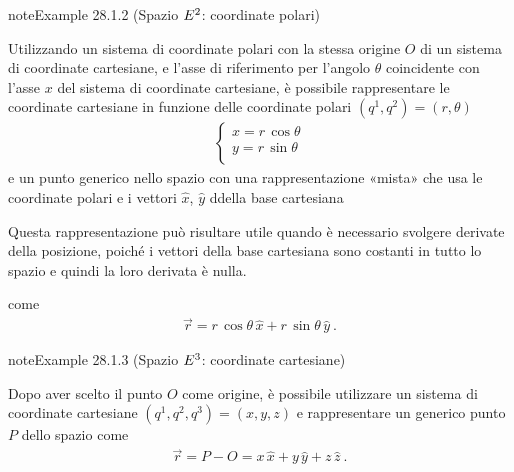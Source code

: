 \documentclass[letterpaper,10pt,italian]{jupyterBook}
\begin{document}
\begin{sphinxadmonition}{note}{Example 28.1.2 (Spazio \protect\(E^2\protect\): coordinate polari)}



\sphinxAtStartPar
Utilizzando un sistema di coordinate polari con la stessa origine \(O\) di un sistema di coordinate cartesiane, e l’asse di riferimento per l’angolo \(\theta\) coincidente con l’asse \(x\) del sistema di coordinate cartesiane, è possibile rappresentare le coordinate cartesiane in funzione delle coordinate polari \((q^1, q^2) = (r, \theta)\)
\begin{equation*}
\begin{split}\begin{cases}
  x = r \, \cos \theta \\
  y = r \, \sin \theta \\
\end{cases}\end{split}
\end{equation*}
\sphinxAtStartPar
e un punto generico nello spazio \sphinxhyphen{} con una rappresentazione «mista» che usa le coordinate polari e i vettori \(\hat{x}\), \(\hat{y}\) ddella base cartesiana%
\begin{footnote}[1]\sphinxAtStartFootnote
Questa rappresentazione può risultare utile quando è necessario svolgere derivate della posizione, poiché i vettori della base cartesiana sono costanti in tutto lo spazio e quindi la loro derivata è nulla.  
%
\end{footnote} \sphinxhyphen{} come
\begin{equation*}
\begin{split}\vec{r} = r \, \cos \theta \, \hat{x} + r \, \sin \theta \, \hat{y} \ .\end{split}
\end{equation*}\end{sphinxadmonition}
\label{ch/vector-calculus/geometry:example-3}
\begin{sphinxadmonition}{note}{Example 28.1.3 (Spazio \protect\(E^3\protect\): coordinate cartesiane)}



\sphinxAtStartPar
Dopo aver scelto il punto \(O\) come origine, è possibile utilizzare un sistema di coordinate cartesiane \((q^1, q^2, q^3) = (x,y,z)\) e rappresentare un generico punto \(P\) dello spazio come
\begin{equation*}
\begin{split}\vec{r} = P - O = x \, \hat{x} + y \, \hat{y} + z \, \hat{z} \ .\end{split}
\end{equation*}\end{sphinxadmonition}
\end{document}
